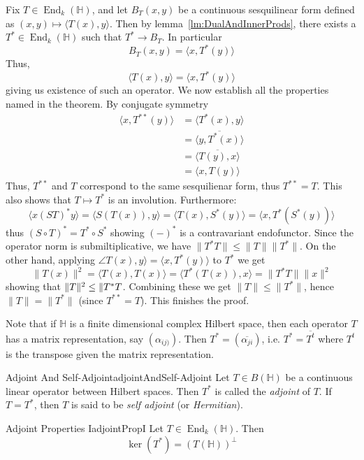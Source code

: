 \documentclass[oneside]{book}
\renewcommand{\H}{\mathbb{H}}
\newcommand{\oln}{\overline}
\newcommand{\End}{\operatorname{End}}
\begin{document}
\begin{Proof}
	Fix $T \in \End_k(\H)$, and let $B_T(x,y)$ be a continuous sesquilinear form defined as $(x,y) \mapsto \langle T(x), y
	\rangle$. Then by lemma~\ref{lm:DualAndInnerProds}, there exists a $T^* \in \End_k(\H)$ such that $T^* \to B_T$. In
	particular
	\[
		B_T(x,y) = \langle x, T^*(y) \rangle
	\]
	Thus,
	\[
		\langle T(x), y\rangle = \langle x, T^*(y)\rangle
	\]
	giving us existence of such an operator. We now establish all the properties named in the theorem. By conjugate
	symmetry
	\begin{align*}
		\langle x, T^{**}(y)\rangle &= \langle T^*(x), y\rangle\\
			&= \oln{\langle y, T^*(x)\rangle}\\
			&= \oln{\langle T(y), x\rangle}\\
			&= \langle x, T(y)\rangle
	\end{align*}
	Thus, $T^{**}$ and $T$ correspond to the same sesquilienar form, thus $T^{**} = T$. This also shows that
	$T\mapsto T^{*}$ is an involution. Furthermore:
	\[
		\langle x (ST)^*y\rangle = \langle S(T(x)), y\rangle = \langle T(x), S^*(y)\rangle = \langle x,
		T^*(S^*(y))\rangle
	\]
	thus $(S\circ T)^* = T^*\circ S^*$ showing $(-)^*$ is a contravariant endofunctor. Since the operator norm
	is submiltiplicative, we have $\|T^*T\| \le \|T\|\|T^*\|$. On the other hand, applying $\angle T(x), y\rangle
	= \langle x, T^*(y)\rangle$ to $T^*$ we get
	\[
		\|T(x)\|^2 = \langle T(x), T(x)\rangle = \langle T^*(T(x)), x\rangle = \|T^*T\|\|x\|^2
	\]
	showing that $\|T\|^2 \le \|T^*T\\$. Combining these we get $\|T\|\le \|T^*\|$, hence $\|T\| = \|T^*\|$ (since
	$T^{**} = T$). This finishes the proof.
\end{Proof}

Note that if $\H$ is a finite dimensional complex Hilbert space, then each operator $T$ has a matrix representation, say
$(\alpha_{ij)})$. Then $T^* = (\oln{\alpha_{ji}})$, i.e. $T^* = \oln{T^t}$ where $T^t$ is the transpose given the matrix
representation.

\begin{defn}{Adjoint And Self-Adjoint}{adjointAndSelf-Adjoint}
	Let $T \in B(\H)$ be a continuous linear operator between Hilbert spaces. Then $T^*$ is called the
	\emph{adjoint} of $T$. If $T = T^*$, then $T$ is said to be \emph{self adjoint} (or \emph{Hermitian}).
\end{defn}

\begin{prop}{Adjoint Properties I}{adjointPropI}
	Let $T \in \End_k(\H)$. Then
	\[
		\ker(T^*) = (T(\H))^\perp
	\]
\end{prop}
\end{document}

